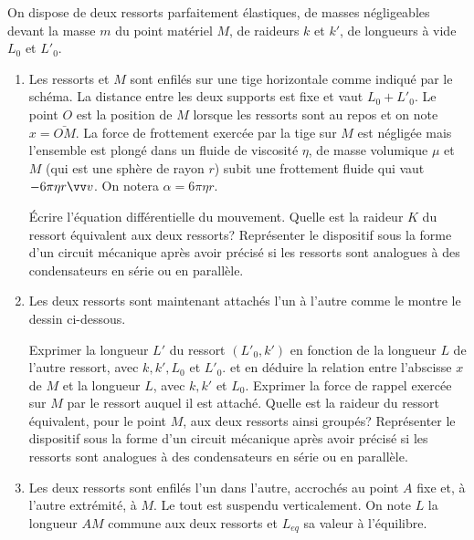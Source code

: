 \begin{exercice}
  On dispose de deux ressorts parfaitement élastiques, de masses négligeables 
  devant la masse \(m\) du point matériel \(M\), de raideurs \(k\) et \(k'\), de 
  longueurs à vide \(L_0\) et \(L'_0\).
  \begin{enumerate}
    \item Les ressorts et \(M\) sont enfilés sur une tige horizontale comme 
      indiqué par le schéma. La distance entre les deux supports est fixe et 
      vaut \(L_0+L'_0\). Le point \(O\) est la position de \(M\) lorsque les 
      ressorts sont au repos et on note \(x = \bar{OM}\).
      La force de frottement exercée par la tige sur \(M\) est négligée mais 
      l'ensemble est plongé dans un fluide de viscosité \(\eta\), de masse 
      volumique \(\mu\) et \(M\) (qui est une sphère de rayon \(r\)) subit une 
      frottement fluide qui vaut \(-6\pi\eta r \vvv\). On notera \(\alpha = 
      6\pi\eta r\).

      Écrire l'équation différentielle du mouvement. Quelle est la raideur \(K\) 
      du ressort équivalent aux deux ressorts? Représenter le dispositif sous la 
      forme d'un circuit mécanique après avoir précisé si les ressorts sont 
      analogues à des condensateurs en série ou en parallèle.
    \item Les deux ressorts sont maintenant attachés l'un à l'autre comme le 
      montre le dessin ci-dessous.

      Exprimer la longueur \(L'\) du ressort \((L'_0, k')\) en fonction de la 
      longueur \(L\) de l'autre ressort, avec \(k, k', L_0\) et \(L'_0\). et en 
      déduire la relation entre l'abscisse \(x\) de \(M\) et la longueur \(L\), 
      avec \(k, k'\) et \(L_0\). Exprimer la force de rappel exercée sur \(M\) 
      par le ressort auquel il est attaché. Quelle est la raideur du ressort 
      équivalent, pour le point \(M\), aux deux ressorts ainsi groupés?
      Représenter le dispositif sous la forme d'un circuit mécanique après avoir 
      précisé si les ressorts sont analogues à des condensateurs en série ou en 
      parallèle.
    \item Les deux ressorts sont enfilés l'un dans l'autre, accrochés au point 
      \(A\) fixe et, à l'autre extrémité, à \(M\). Le tout est suspendu 
      verticalement. On note \(L\) la longueur \(AM\) commune aux deux ressorts 
      et \(L_{eq}\) sa valeur à l'équilibre.


\end{enumerate}
\end{exercice}
